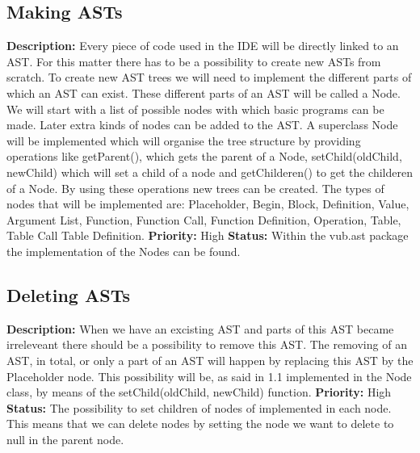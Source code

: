 \documentclass[a4paper,12pt]{report}
\begin{document}
\subsection{Making ASTs}
\textbf{Description: } Every piece of code used in the IDE will be directly linked to an AST. For this matter there has to be a possibility to create new ASTs from scratch.
To create new AST trees we will need to implement the different parts of which an AST can exist. These different parts of an AST will be called a Node. We will start with
a list of possible nodes with which basic programs can be made. Later extra kinds of nodes can be added to the AST.
A superclass Node will be implemented which will organise the tree structure by providing operations like getParent(), which gets the parent of a Node, setChild(oldChild, newChild)
which will set a child of a node and getChilderen() to get the childeren of a Node. By using these operations new trees can be created. 
The types of nodes that will be implemented are: Placeholder, Begin, Block, Definition, Value, Argument List, Function, Function Call, Function Definition, Operation, Table, Table Call
Table Definition.
 \newline
\textbf{Priority:} High \newline
\textbf{Status: }  Within the vub.ast package the implementation of the Nodes can be found.   \newline
\subsection{Deleting ASTs}
\textbf{Description: }When we have an excisting AST and parts of this AST became irreleveant there should be a possibility to remove this AST. The removing of an AST, in total,
or only a part of an AST will happen by replacing this AST by the Placeholder node. This possibility will be, as said in 1.1 implemented in the Node class, by means of the 
setChild(oldChild, newChild) function. \newline
\textbf{Priority:} High \newline
\textbf{Status: } The possibility to set children of nodes of implemented in each node. This means that we can delete nodes by setting the 
node we want to delete to null in the parent node.\newline
\end{document}
